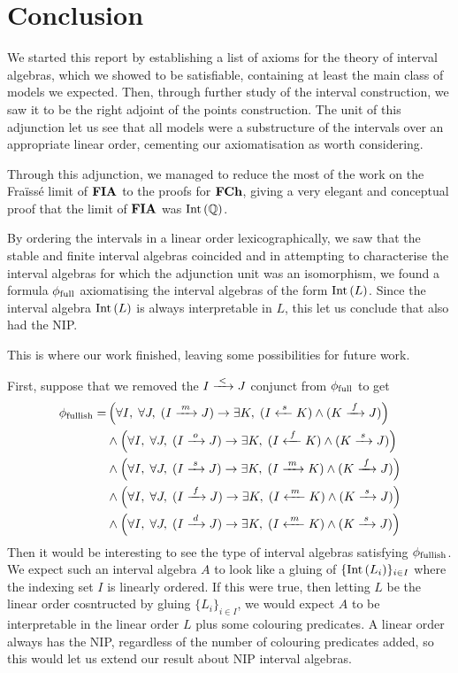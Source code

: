 \section{Conclusion}
\label{sec:conclusion}

We started this report by establishing a list of axioms for the theory of interval algebras, which
we showed to be satisfiable, containing at least the main class of models we expected. Then,
through further study of the interval construction, we saw it to be the right adjoint of
the points construction. The unit of this adjunction let us see that all models were
a substructure of the intervals over an appropriate linear order, cementing our axiomatisation as
worth considering.

Through this adjunction, we managed to reduce the most of the work on the Fraïssé limit of
$\finaia$ to the proofs for $\finslo$, giving a very elegant and conceptual proof that the limit
of $\finaia$ was $\inter[\Q]$.

By ordering the intervals in a linear order lexicographically, we saw that the stable and finite
interval algebras coincided and in attempting to characterise the interval algebras for which the
adjunction unit was an isomorphism, we found a formula $\allints$ axiomatising the interval
algebras of the form $\inter[L]$. Since the interval algebra $\inter[L]$ is always interpretable in
$L$, this let us conclude that also had the NIP.

This is where our work finished, leaving some possibilities for future work.

First, suppose that we removed the $I \before J$ conjunct from $\allints$ to get
\begin{align*}
  \mostints = & \left(\forall I,\; \forall J,\;
        (I \meets J)     \rightarrow \exists K,\; (I \startedby K)  \land (K \finishes J) \right)\\
    & \land \left(\forall I,\; \forall J,\;
        (I \overlaps J)  \rightarrow \exists K,\; (I \finishedby K) \land (K \starts J)   \right)\\
    & \land \left(\forall I,\; \forall J,\;
        (I \starts J)    \rightarrow \exists K,\; (I \meets K)      \land (K \finishes J) \right)\\
    & \land \left(\forall I,\; \forall J,\;
        (I \finishes J)  \rightarrow \exists K,\; (I \metby K)      \land (K \starts J)   \right)\\
    & \land \left(\forall I,\; \forall J,\;
        (I \contained J) \rightarrow \exists K,\; (I \metby K)      \land (K \starts J)   \right)
\end{align*}
Then it would be interesting to see the type of interval algebras satisfying $\mostints$. We expect
such an interval algebra $A$ to look like a gluing of $\{ \inter[L_i] \}_{i \in I}$ where the
indexing set $I$ is linearly ordered. If this were true, then letting $L$ be the linear order
cosntructed by gluing $\{L_i\}_{i \in I}$, we would expect $A$ to be interpretable in the linear
order $L$ plus some colouring predicates. A linear order always has the NIP, regardless of the
number of colouring predicates added, so this would let us extend our result about NIP interval
algebras.

